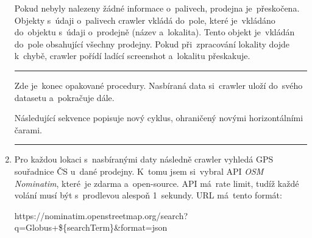 \begin{enumerate}
        Pokud nebyly nalezeny žádné informace o~palivech, prodejna
        je~přeskočena. Objekty s~údaji o~palivech crawler vkládá do~pole,
        které je~vkládáno do~objektu s~údaji o~prodejně (název a~lokalita).
        Tento objekt je~vkládán do~pole obsahující všechny prodejny. Pokud
        při~zpracování lokality dojde k~chybě, crawler pořídí ladící screenshot
        a~lokalitu přeskakuje.
        \medskip    \hrule  \medskip
        Zde je~konec opakované procedury. Nasbíraná data si~crawler uloží
        do~svého datasetu a~pokračuje dále.
        
        Následující sekvence popisuje nový cyklus, ohraničený novými
        horizontálními čarami.
        \medskip    \hrule
    \item Pro každou lokaci s~nasbíranými daty následně crawler vyhledá GPS
        souřadnice ČS u~dané prodejny. K~tomu jsem si~vybral API \emph{OSM
        Nominatim}, které~je zdarma a~open-source. API má~rate limit, tudíž
        každé volání musí být s~prodlevou alespoň 1~sekundy. URL má~tento
        formát:
        
        \begin{tt}
            \centering
            https://nominatim.openstreetmap.org/search?q=Globus+\$\{searchTerm\}\&format=json
        \end{tt}
        

\end{enumerate}
